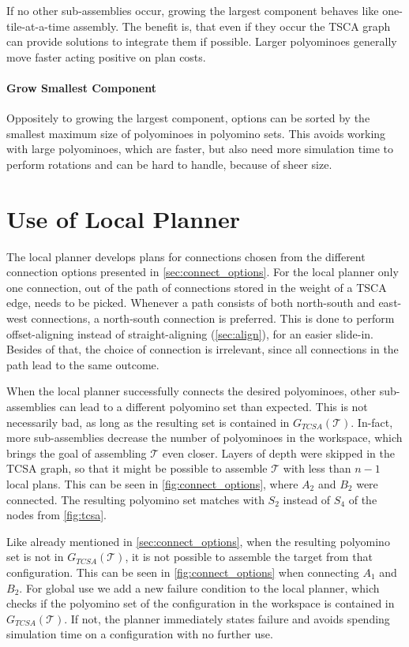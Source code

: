 If no other sub-assemblies occur, growing the largest component behaves like one-tile-at-a-time assembly.
The benefit is, that even if they occur the TSCA graph can provide solutions to integrate them if possible.
Larger polyominoes generally move faster acting positive on plan costs.

\paragraph{Grow Smallest Component}

Oppositely to growing the largest component, options can be sorted by the smallest maximum size of polyominoes in polyomino sets.
This avoids working with large polyominoes, which are faster, but also need more simulation time to perform rotations and can be hard to handle, because of sheer size.


\section{Use of Local Planner}
\label{sec:local_in_global}

The local planner develops plans for connections chosen from the different connection options presented in \autoref{sec:connect_options}.
For the local planner only one connection, out of the path of connections stored in the weight of a TSCA edge, needs to be picked.
Whenever a path consists of both north-south and east-west connections, a north-south connection is preferred.
This is done to perform offset-aligning instead of straight-aligning (\autoref{sec:align}), for an easier slide-in.
Besides of that, the choice of connection is irrelevant, since all connections in the path lead to the same outcome.

When the local planner successfully connects the desired polyominoes, other sub-assemblies can lead to a different polyomino set than expected.
This is not necessarily bad, as long as the resulting set is contained in $G_{\textit{TCSA}}(\mathcal{T})$.
In-fact, more sub-assemblies decrease the number of polyominoes in the workspace, which brings the goal of assembling $\mathcal{T}$ even closer.
Layers of depth were skipped in the TCSA graph, so that it might be possible to assemble $\mathcal{T}$ with less than $n-1$ local plans.
This can be seen in \autoref{fig:connect_options}, where $A_2$ and $B_2$ were connected. 
The resulting polyomino set matches with $S_2$ instead of $S_4$ of the nodes from \autoref{fig:tcsa}.

Like already mentioned in \autoref{sec:connect_options}, when the resulting polyomino set is not in $G_{\textit{TCSA}}(\mathcal{T})$, it is not possible to assemble the target from that configuration.
This can be seen in \autoref{fig:connect_options} when connecting $A_1$ and $B_2$.
For global use we add a new failure condition to the local planner, which checks if the polyomino set of the configuration in the workspace is contained in $G_{\textit{TCSA}}(\mathcal{T})$.
If not, the planner immediately states failure and avoids spending simulation time on a configuration with no further use.

